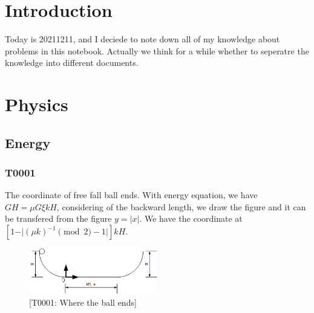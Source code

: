\documentclass[UTF8]{article}
\begin{document}
\section{Introduction}
Today is 20211211, and I deciede to note down all of my knowledge about problems in this notebook. Actually we think for a while whether to seperatre the knowledge into different documents.

\section{Physics}

\subsection{Energy}

\subsubsection{T0001}
The coordinate of free fall ball ends. With energy equation, we have $GH = \mu G \xi kH$, considering of the backward length, we draw the figure and it can be transfered from the figure $y = |x|$. We have the coordinate
at $[1-\vert (\mu k)^{-1} \pmod 2 -1 \vert ]kH $.
\begin{figure}[h]
    \centering
    \includegraphics[width=0.5\textwidth]{../../resources/T0001.png}
    \caption{[T0001: Where the ball ends]}
    \label{fig:1}
\end{figure}
\end{document}
